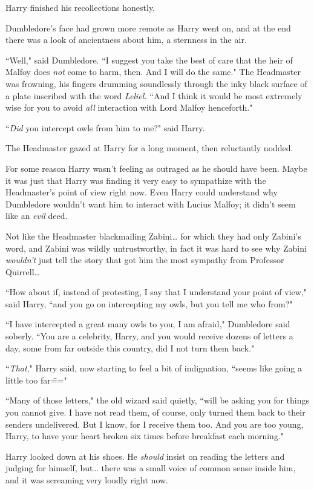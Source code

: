 Harry finished his recollections honestly.

Dumbledore's face had grown more remote as Harry went on, and at the end there was a look of ancientness about him, a sternness in the air.

``Well," said Dumbledore. ``I suggest you take the best of care that the heir of Malfoy does \emph{not} come to harm, then. And I will do the same." The Headmaster was frowning, his fingers drumming soundlessly through the inky black surface of a plate inscribed with the word \emph{Leliel.} ``And I think it would be most extremely wise for you to avoid \emph{all} interaction with Lord Malfoy henceforth."

``\emph{Did} you intercept owls from him to me?" said Harry.

The Headmaster gazed at Harry for a long moment, then reluctantly nodded.

For some reason Harry wasn't feeling as outraged as he should have been. Maybe it was just that Harry was finding it very easy to sympathize with the Headmaster's point of view right now. Even Harry could understand why Dumbledore wouldn't want him to interact with Lucius Malfoy; it didn't seem like an \emph{evil} deed.

Not like the Headmaster blackmailing Zabini{\ldots} for which they had only Zabini's word, and Zabini was wildly untrustworthy, in fact it was hard to see why Zabini \emph{wouldn't} just tell the story that got him the most sympathy from Professor Quirrell{\ldots}

``How about if, instead of protesting, I say that I understand your point of view," said Harry, ``and you go on intercepting my owls, but you tell me who from?"

``I have intercepted a great many owls to you, I am afraid," Dumbledore said soberly. ``You are a celebrity, Harry, and you would receive dozens of letters a day, some from far outside this country, did I not turn them back."

``\emph{That}," Harry said, now starting to feel a bit of indignation, ``seems like going a little too far\==="

``Many of those letters," the old wizard said quietly, ``will be asking you for things you cannot give. I have not read them, of course, only turned them back to their senders undelivered. But I know, for I receive them too. And you are too young, Harry, to have your heart broken six times before breakfast each morning."

Harry looked down at his shoes. He \emph{should} insist on reading the letters and judging for himself, but{\ldots} there was a small voice of common sense inside him, and it was screaming very loudly right now.

